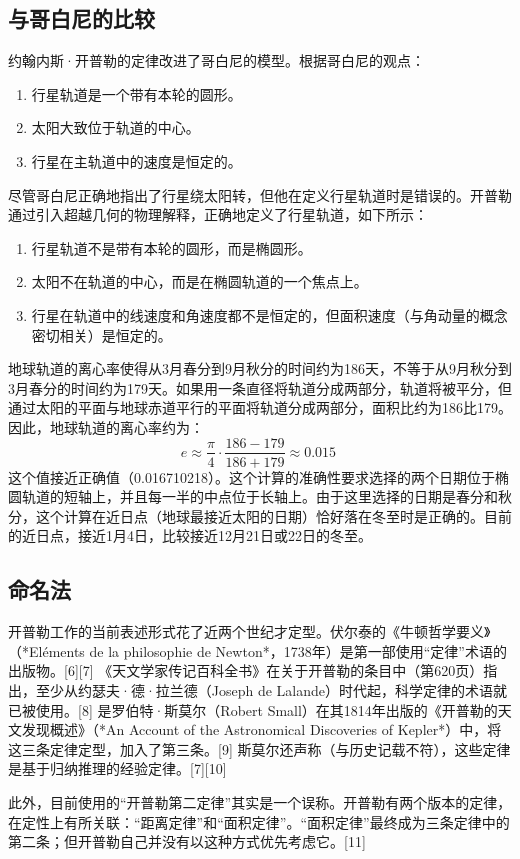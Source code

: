 \subsection{与哥白尼的比较 } 
约翰内斯·开普勒的定律改进了哥白尼的模型。根据哥白尼的观点：
\begin{enumerate}
\item 行星轨道是一个带有本轮的圆形。
\item 太阳大致位于轨道的中心。
\item 行星在主轨道中的速度是恒定的。
\end{enumerate}
尽管哥白尼正确地指出了行星绕太阳转，但他在定义行星轨道时是错误的。开普勒通过引入超越几何的物理解释，正确地定义了行星轨道，如下所示：
\begin{enumerate}
\item 行星轨道不是带有本轮的圆形，而是椭圆形。
\item 太阳不在轨道的中心，而是在椭圆轨道的一个焦点上。
\item 行星在轨道中的线速度和角速度都不是恒定的，但面积速度（与角动量的概念密切相关）是恒定的。
\end{enumerate}
地球轨道的离心率使得从3月春分到9月秋分的时间约为186天，不等于从9月秋分到3月春分的时间约为179天。如果用一条直径将轨道分成两部分，轨道将被平分，但通过太阳的平面与地球赤道平行的平面将轨道分成两部分，面积比约为186比179。因此，地球轨道的离心率约为：
\[
e \approx \frac{\pi}{4} \cdot \frac{186-179}{186+179} \approx 0.015~
\]
这个值接近正确值（0.016710218）。这个计算的准确性要求选择的两个日期位于椭圆轨道的短轴上，并且每一半的中点位于长轴上。由于这里选择的日期是春分和秋分，这个计算在近日点（地球最接近太阳的日期）恰好落在冬至时是正确的。目前的近日点，接近1月4日，比较接近12月21日或22日的冬至。
\subsection{命名法}  
开普勒工作的当前表述形式花了近两个世纪才定型。伏尔泰的《牛顿哲学要义》（*Eléments de la philosophie de Newton*，1738年）是第一部使用“定律”术语的出版物。[6][7] 《天文学家传记百科全书》在关于开普勒的条目中（第620页）指出，至少从约瑟夫·德·拉兰德（Joseph de Lalande）时代起，科学定律的术语就已被使用。[8] 是罗伯特·斯莫尔（Robert Small）在其1814年出版的《开普勒的天文发现概述》（*An Account of the Astronomical Discoveries of Kepler*）中，将这三条定律定型，加入了第三条。[9] 斯莫尔还声称（与历史记载不符），这些定律是基于归纳推理的经验定律。[7][10]

此外，目前使用的“开普勒第二定律”其实是一个误称。开普勒有两个版本的定律，在定性上有所关联：“距离定律”和“面积定律”。“面积定律”最终成为三条定律中的第二条；但开普勒自己并没有以这种方式优先考虑它。[11]
